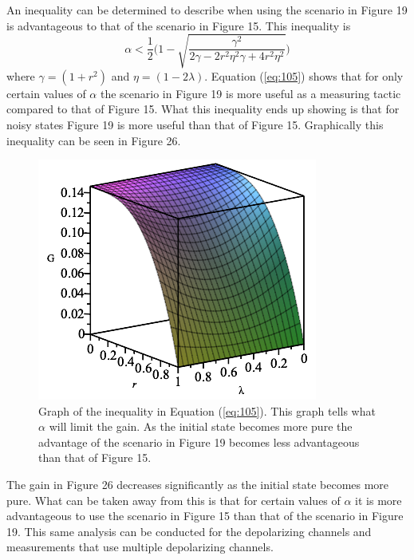 \documentclass[twocolumn]{article}
\begin{document}
An inequality can be determined to describe when using the scenario in Figure 19 is advantageous to that of the scenario in Figure 15. This inequality is
\begin{equation}\label{eq:105}
\alpha < \frac{1}{2}\Bigg(1-\sqrt{\frac{\gamma^2}{2\gamma-2r^2\eta^2\gamma+4r^2\eta^2}}\Bigg)
\end{equation}
where $\gamma=(1+r^2)$ and $\eta=(1-2\lambda)$. Equation (\ref{eq:105}) shows that for only certain values of $\alpha$ the scenario in Figure 19 is more useful as a measuring tactic compared to that of Figure 15. What this inequality ends up showing is that for noisy states Figure 19 is more useful than that of Figure 15. Graphically this inequality can be seen in Figure 26.
\begin{figure}[h]
\begin{center}
\includegraphics[width=0.65\linewidth]{Phase-Flip-Alpha-Inequality-Graph.png}
\caption{Graph of the inequality in Equation (\ref{eq:105}). This graph tells what $\alpha$ will limit the gain. As the initial state becomes more pure the advantage of the scenario in Figure 19 becomes less advantageous than that of Figure 15.}
\end{center}
\end{figure}
\newline
The gain in Figure 26 decreases significantly as the initial state becomes more pure. What can be taken away from this is that for certain values of $\alpha$ it is more advantageous to use the scenario in Figure 15 than that of the scenario in Figure 19. This same analysis can be conducted for the depolarizing channels and measurements that use multiple depolarizing channels.
\end{document}
